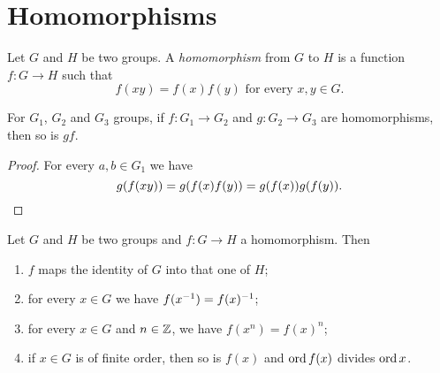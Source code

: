 
\section{Homomorphisms}

\begin{definition}[Homomorphisms]
Let \(G\) and \(H\) be two groups. A {\em homomorphism} from \(G\) to \(H\) is a function \(f : G \to H\) such that
\[f(xy) = f(x) f(y) \text{ for every } x, y \in G .\] 
\end{definition}

\begin{proposition}
For \(G_1\), \(G_2\) and \(G_3\) groups, if \(f : G_1 \to G_2\) and \(g : G_2 \to G_3\) are homomorphisms, then so is \(g f\).
\end{proposition}

\begin{proof}
For every \(a, b \in G_1\) we have
\[g(f(xy)) = g(f(x)f(y)) = g(f(x))g(f(y)).\qedhere\]
\end{proof}

\begin{proposition}\label{prop:HomProps}
Let \(G\) and \(H\) be two groups and \(f : G \to H\) a homomorphism. Then
\begin{enumerate}
\item \(f\) maps the identity of \(G\) into that one of \(H\);
\item for every \(x \in G\) we have \(f(x^{-1}) = f(x)^{-1}\);
\item for every \(x \in G\) and \(n \in \mathbb Z\), we have \(f(x^n) = f(x)^n\);
\item if \(x \in G\) is of finite order, then so is \(f(x)\) and \(\operatorname{ord} f(x)\) divides \(\operatorname{ord} x\).
\end{enumerate}
\end{proposition}

